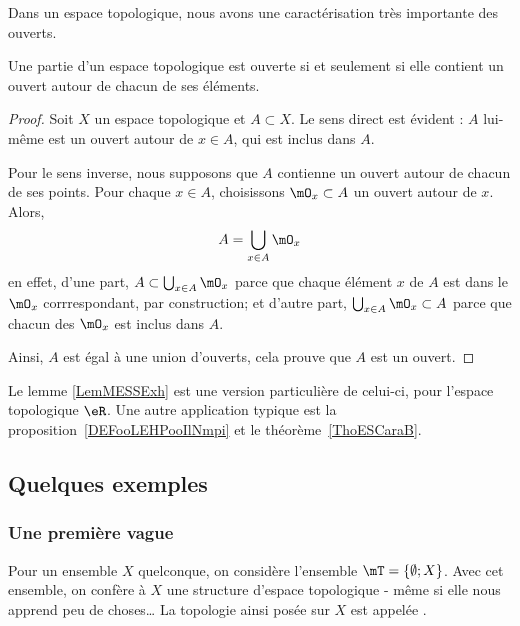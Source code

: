 Dans un espace topologique, nous avons une caractérisation très importante des ouverts.
\begin{theorem}		\label{ThoPartieOUvpartouv}
    Une partie d'un espace topologique est ouverte si et seulement si elle contient un ouvert autour de chacun de ses éléments.
\end{theorem}

\begin{proof}
    Soit \( X\) un espace topologique et \( A\subset X\). Le sens direct est évident : $A$ lui-même est un ouvert autour de $x\in A$, qui est inclus dans $A$.

Pour le sens inverse, nous supposons que \( A\) contienne un ouvert autour de chacun de ses points. Pour chaque $x\in A$, choisissons $\mO_x\subset A$ un ouvert autour de $x$. Alors,
\begin{equation}	\label{EqAUniondesOx}
	A=\bigcup_{x\in A}\mO_x
\end{equation}
en effet, d'une part, $A\subset\bigcup_{x\in A}\mO_x$ parce que chaque élément $x$ de $A$ est dans le $\mO_x$ corrrespondant, par construction; et d'autre part, $\bigcup_{x\in A}\mO_x\subset A$ parce que chacun des $\mO_x$ est inclus dans $A$.

Ainsi, $A$ est égal à une union d'ouverts, cela prouve que $A$ est un ouvert.
\end{proof}
Le lemme \ref{LemMESSExh} est une version particulière de celui-ci, pour l'espace topologique \( \eR \). Une autre application typique est la proposition~\ref{DEFooLEHPooIlNmpi} et le théorème~\ref{ThoESCaraB}.

\subsection{Quelques exemples}

\subsubsection{Une première vague}

\begin{example}\label{DefTopologieGrossiere}
  Pour un ensemble \( X \) quelconque, on considère l'ensemble \( \mT = \{ \emptyset; X\} \). Avec cet ensemble, on confère à \(X \) une structure d'espace topologique - même si elle nous apprend peu de choses\dots{} La topologie ainsi posée sur \(X \) est appelée .
\end{example}

